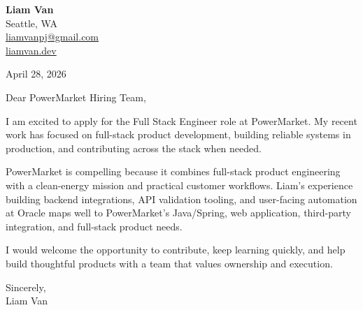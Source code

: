 \documentclass[letterpaper,11pt]{article}
\begin{document}
\begin{flushleft}
\textbf{\Large Liam Van} \\
Seattle, WA \\
\href{mailto:liamvanpj@gmail.com}{liamvanpj@gmail.com} \\
\href{https://liamvan.dev}{liamvan.dev}
\end{flushleft}

April 28, 2026

\noindent Dear PowerMarket Hiring Team,

\noindent I am excited to apply for the Full Stack Engineer role at PowerMarket. My recent work has focused on full-stack product development, building reliable systems in production, and contributing across the stack when needed.

\noindent PowerMarket is compelling because it combines full-stack product engineering with a clean-energy mission and practical customer workflows. Liam's experience building backend integrations, API validation tooling, and user-facing automation at Oracle maps well to PowerMarket's Java/Spring, web application, third-party integration, and full-stack product needs.

\noindent I would welcome the opportunity to contribute, keep learning quickly, and help build thoughtful products with a team that values ownership and execution.

\noindent Sincerely, \\
Liam Van
\end{document}
